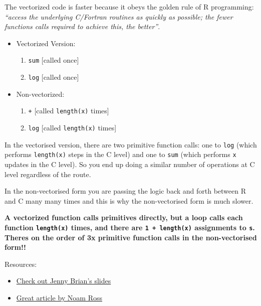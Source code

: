 \documentclass[]{book}
\providecommand{\tightlist}{%
  \setlength{\itemsep}{0pt}\setlength{\parskip}{0pt}}
\begin{document}
The vectorized code is faster because it obeys the golden rule of R programming: \emph{``access the underlying C/Fortran routines as quickly as possible; the fewer functions calls required to achieve this, the better''}.

\begin{itemize}
\tightlist
\item
  Vectorized Version:

  \begin{enumerate}
  \def\labelenumi{\arabic{enumi}.}
  \tightlist
  \item
    \texttt{sum} {[}called once{]}
  \item
    \texttt{log} {[}called once{]}
  \end{enumerate}
\item
  Non-vectorized:

  \begin{enumerate}
  \def\labelenumi{\arabic{enumi}.}
  \tightlist
  \item
    \texttt{+} {[}called \texttt{length(x)} times{]}
  \item
    \texttt{log} {[}called \texttt{length(x)} times{]}
  \end{enumerate}
\end{itemize}

In the vectorised version, there are two primitive function calls: one to \texttt{log} (which performs \texttt{length(x)} steps in the C level) and one to \texttt{sum} (which performs \texttt{x} updates in the C level). So you end up doing a similar number of operations at C level regardless of the route.

In the non-vectorised form you are passing the logic back and forth between R and C many many times and this is why the non-vectorised form is much slower.

\textbf{A vectorized function calls primitives directly, but a loop calls each function \texttt{length(x)} times, and there are \texttt{1\ +\ length(x)} assignments to \texttt{s}. Theres on the order of 3x primitive function calls in the non-vectorised form!!}

Resources:

\begin{itemize}
\item
  \href{https://speakerdeck.com/jennybc/row-oriented-workflows-in-r-with-the-tidyverse}{Check out Jenny Brian's slides}
\item
  \href{https://www.noamross.net/archives/2014-04-16-vectorization-in-r-why/}{Great article by Noam Ross}
\end{itemize}
\end{document}

